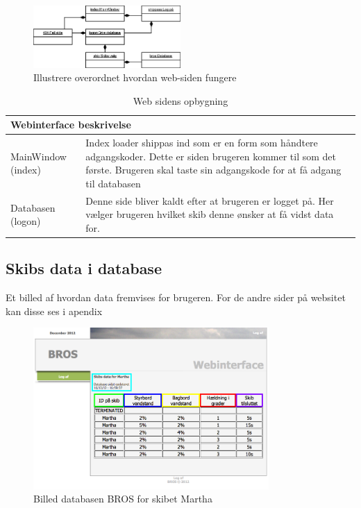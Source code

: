 \begin{figure}[H]
\centering
\includegraphics[width = 0.5\textwidth]{billeder/database_web}
\caption{Illustrere overordnet hvordan web-siden fungere}
\label{fig:database_web}
\end{figure}

\begin{table}[H]
\centering
\begin{tabular}{p{3cm} p{12.5cm}}
\multicolumn{2}{l}{{\Large Webinterface beskrivelse}} \\\hline
MainWindow \phantom{m}(index) & Index loader shippas ind som er en form som håndtere adgangskoder. Dette er siden brugeren kommer til som det første. Brugeren skal taste sin adgangskode for at få adgang til databasen\\
Databasen  \phantom{m}(logon) & Denne side bliver kaldt efter at brugeren er logget på. Her vælger brugeren hvilket skib denne ønsker at få vidst data for.\\
\end{tabular}
\caption{Web sidens opbygning}
\label{tabel:webside-simpel}
\end{table}

\subsection*{Skibs data i database}
Et billed af hvordan data fremvises for brugeren. For de andre sider på websitet kan disse ses i apendix
\begin{figure}[H]
	\centering
	\includegraphics[width=0.8\textwidth]{billeder/web_database}
	\caption{Billed databasen BROS for skibet Martha}
	\label{fig:web_database}
\end{figure}

